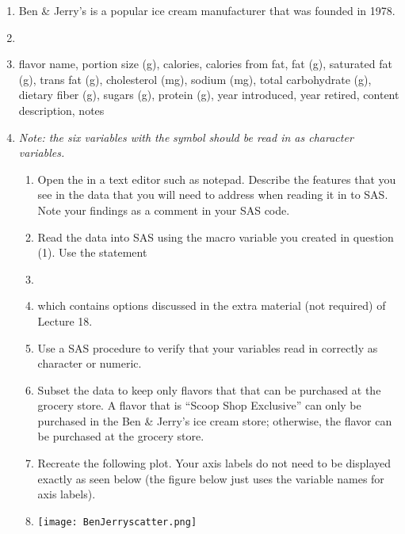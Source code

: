 \begin{enumerate}
\begin{enumerate}
\item Create a data set which only has one observation per team 1 and that only keeps the variables team 1 name and cumulative total number of wins.  Print this data set.  So that you may check your work, the first three observations are displayed below.
\item[]
\begin{craw}{.0}{first 3 observations}
  Obs    team1                    num_wins
    1    Alabama                      4
    2    Arizona State                1
    3    California                   2
 \end{craw}
\end{enumerate}
\item Ben \& Jerry's is a popular ice cream manufacturer that was founded in 1978.
\item[] \underline{}
\item[]   flavor name, portion size (g), calories, calories from fat, fat (g), saturated fat (g), trans fat (g), cholesterol (mg), sodium (mg), total carbohydrate (g),  dietary fiber (g), sugars (g), protein (g),  year introduced,  year retired,  content description,  notes
\item[] \emph{Note: the six variables with the}  \emph{symbol should be read in as character variables.}
\begin{enumerate}
\item Open the  in a text editor such as notepad.  Describe the features that you see in the data that you will need to address when reading it in to SAS.  Note your findings as a comment in your SAS code.
\item Read the data into SAS using the macro variable you created in question (1).  Use the  statement
\item[]
\item[] which contains options discussed in the extra material (not required) of Lecture 18.
\item Use a SAS procedure to verify that your variables read in correctly as character or numeric.
\item Subset the data to keep only flavors that that can be purchased at the grocery store.  A flavor that is ``Scoop Shop Exclusive'' can only be purchased in the Ben \& Jerry's ice cream store; otherwise, the flavor can be purchased at the grocery store.
\item Recreate the following plot.  Your axis labels do not need to be displayed exactly as seen below (the figure below just uses the variable names for axis labels).
\item[] \texttt{[image: BenJerryscatter.png]}
\end{enumerate}

\end{enumerate}
 